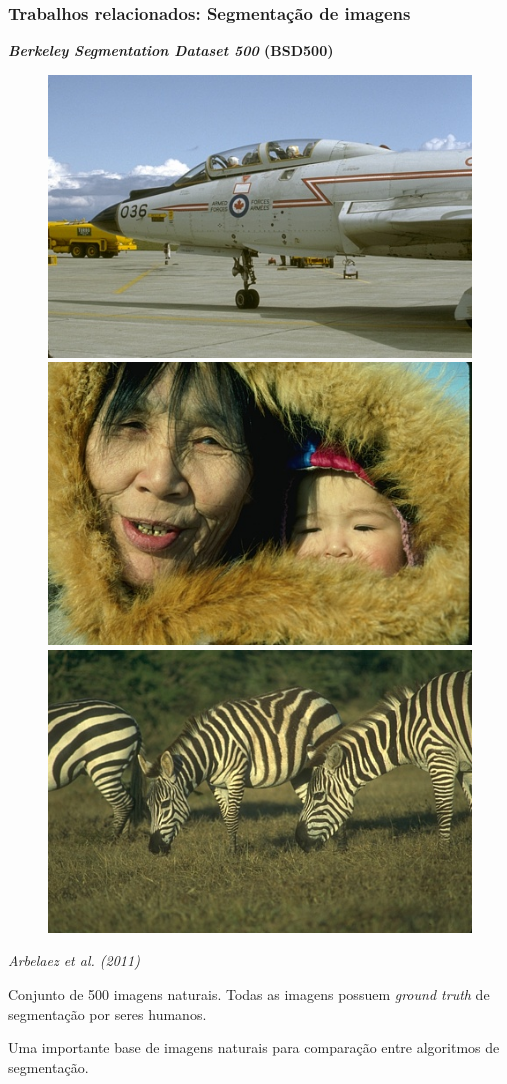 \documentclass[t]{beamer}
\begin{document}
\begin{frame}[c]
	\frametitle{Trabalhos relacionados: Segmentação de imagens}

	\textbf{\textit{Berkeley Segmentation Dataset 500} (BSD500)}
	
	\begin{figure}[h]
		\includegraphics[width=.3\textwidth]{imgs/bsd500_1}
		\hspace{0.1cm}
		\includegraphics[width=.3\textwidth]{imgs/bsd500_2}
		\hspace{0.1cm}
		\includegraphics[width=.3\textwidth]{imgs/bsd500_3}
	\end{figure}

	\textit{Arbelaez et al. (2011)}

	\vspace{.5cm}
	
	Conjunto de 500 imagens naturais. Todas as imagens possuem \textit{ground truth} de segmentação por seres humanos.

	\vspace{.5cm}

	Uma importante base de imagens naturais para comparação entre algoritmos de segmentação.

\end{frame}
\end{document}
